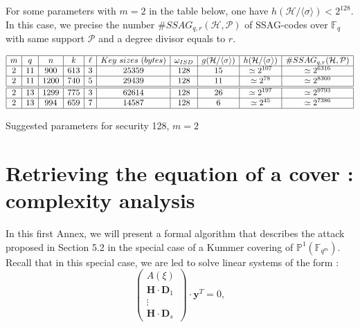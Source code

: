 \documentclass[10pt]{article}
\newcommand{\s}{\vspace{0.3cm}}
\newcommand{\cd}{\cdot}
\newcommand{\PP}{\mathbb{P}}
\newcommand{\calH}{\mathcal{H}}
\newcommand{\fqm}{\mathbb{F}_{q^m}}
\newcommand{\fq}{\mathbb{F}_q}
\newcommand{\w}{\omega}
\newcommand{\PR}{\mathcal{P}}
\begin{document}
\s

For some parameters with $m=2$ in the table below, one have $h(\calH/\langle \sigma \rangle) < 2^{128}$. In this case, we precise the number $\#SSAG_{q,r}(\mathcal{H},\PR)$ of SSAG-codes over $\fq$ with same support $\PR$ and a degree divisor equals to $r$.

\s


\begin{table}[htbp]
\begin{equation*}
\begin{array}{|c|c|c|c|c|c|c|c|c|c|}
\hline
m & q  & n & k & \ell & Key \ sizes \ (bytes) & \w_{ISD} & g(\calH/\langle \sigma \rangle) & h(\calH/\langle \sigma \rangle) & \#SSAG_{q,r}(\mathcal{H},\PR)  \\
\hline
2 & 11  & 900 & 613 & 3 & 25359 & 128 & 15 & \simeq 2^{107} & \simeq 2^{6316} \\
\hline
2 & 11  & 1200 & 740 & 5 & 29439 & 128 & 11 & \simeq 2^{78} & \simeq 2^{8360}\\
\hline \hline
2 & 13  & 1299 & 775 & 3 & 62614 & 128 & 26 & \simeq 2^{197} & \simeq 2^{9793}\\
\hline
2 & 13 & 994 & 659 & 7 & 14587 & 128 & 6 & \simeq 2^{45} & \simeq 2^{7386}\\
\hline
\end{array}
\end{equation*}
\caption{Suggested parameters for security 128, $m = 2$}
\end{table}


\newpage

\appendix

\section{Retrieving the equation of a cover : complexity analysis}

\s

In this first Annex, we will present a formal algorithm that describes the attack proposed in Section 5.2 in the special case of a Kummer covering of $\PP^1(\fqm)$. Recall that in this special case, we are led to solve linear systems of the form :
\begin{equation} \tag{$\Delta(\xi)$}
\begin{pmatrix}
A(\xi) \\
\mathbf{H} \cd \textbf{D}_1 \\
\vdots \\
\mathbf{H} \cd \textbf{D}_s
\end{pmatrix}
\cd \textbf{y}^T = 0,
\end{equation}
\s
\end{document}
